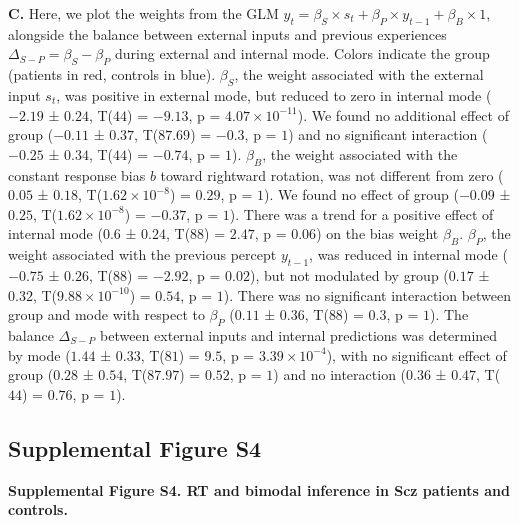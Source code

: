 \documentclass[
]{article}
\begin{document}
\textbf{C.} Here, we plot the weights from the GLM
\(y_t = \beta_S \times s_t + \beta_P \times y_{t-1} + \beta_B \times 1\),
alongside the balance between external inputs and previous experiences
\(\Delta_{S-P} = \beta_S - \beta_P\) during external and internal mode.
Colors indicate the group (patients in red, controls in blue).
\(\beta_S\), the weight associated with the external input \(s_t\), was
positive in external mode, but reduced to zero in internal mode
(\(-2.19\) ± \(0.24\), T(\(44\)) = \(-9.13\), p =
\(\ensuremath{4.07\times 10^{-11}}\)). We found no additional effect of
group (\(-0.11\) ± \(0.37\), T(\(87.69\)) = \(-0.3\), p = \(1\)) and no
significant interaction (\(-0.25\) ± \(0.34\), T(\(44\)) = \(-0.74\), p
= \(1\)). \(\beta_B\), the weight associated with the constant response
bias \(b\) toward rightward rotation, was not different from zero
(\(0.05\) ± \(0.18\), T(\(\ensuremath{1.62\times 10^{-8}}\)) = \(0.29\),
p = \(1\)). We found no effect of group (\(-0.09\) ± \(0.25\),
T(\(\ensuremath{1.62\times 10^{-8}}\)) = \(-0.37\), p = \(1\)). There
was a trend for a positive effect of internal mode (\(0.6\) ± \(0.24\),
T(\(88\)) = \(2.47\), p = \(0.06\)) on the bias weight \(\beta_B\).
\(\beta_P\), the weight associated with the previous percept
\(y_{t-1}\), was reduced in internal mode (\(-0.75\) ± \(0.26\),
T(\(88\)) = \(-2.92\), p = \(0.02\)), but not modulated by group
(\(0.17\) ± \(0.32\), T(\(\ensuremath{9.88\times 10^{-10}}\)) =
\(0.54\), p = \(1\)). There was no significant interaction between group
and mode with respect to \(\beta_P\) (\(0.11\) ± \(0.36\), T(\(88\)) =
\(0.3\), p = \(1\)). The balance \(\Delta_{S-P}\) between external
inputs and internal predictions was determined by mode (\(1.44\) ±
\(0.33\), T(\(81\)) = \(9.5\), p = \(\ensuremath{3.39\times 10^{-4}}\)),
with no significant effect of group (\(0.28\) ± \(0.54\), T(\(87.97\)) =
\(0.52\), p = \(1\)) and no interaction (\(0.36\) ± \(0.47\), T(\(44\))
= \(0.76\), p = \(1\)).

\newpage

\hypertarget{supplemental-figure-s4}{%
\subsection{Supplemental Figure S4}\label{supplemental-figure-s4}}


\textbf{Supplemental Figure S4. RT and bimodal inference in Scz patients
and controls.}
\end{document}
